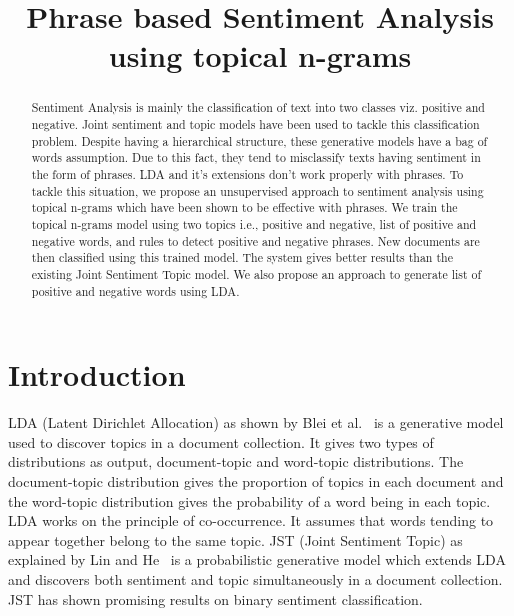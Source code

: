 \documentclass[11pt]{article}
\title{Phrase based Sentiment Analysis using topical n-grams}
\date{}
\begin{document}
\maketitle
\begin{abstract}
Sentiment Analysis is mainly the classification of text into two classes viz. 
positive and negative. Joint sentiment and topic models have been used to 
tackle this classification problem.  Despite having a hierarchical structure, 
these generative models have a bag of words assumption. Due to this fact, 
they tend to misclassify texts having sentiment in the form of phrases. LDA 
and it's extensions don't work properly with phrases. To tackle this situation, 
we propose an unsupervised approach to sentiment analysis using topical n-grams
which have been shown to be effective with phrases. We train the topical n-grams 
model using two topics i.e., positive and negative, list of positive and negative 
words, and rules to detect positive and negative phrases. New documents are then 
classified using this trained model. The system gives better results than the 
existing Joint Sentiment Topic model. We also propose an approach to generate 
list of positive and negative words using LDA.

\end{abstract}

\section{Introduction}


\indent LDA (Latent Dirichlet Allocation) as shown by Blei et al.~ 
is a generative model used to discover topics in a document collection. It gives two types of 
distributions as output, document-topic and word-topic distributions. The document-topic
distribution gives the proportion of topics in each document and the word-topic 
distribution gives the probability of a word being in each topic. LDA works on the 
principle of co-occurrence. It assumes that words tending to appear together belong 
to the same topic. JST (Joint Sentiment Topic) as explained by Lin and He~ 
is a probabilistic generative model which extends LDA and discovers both sentiment 
and topic simultaneously in a document collection. JST has shown promising results 
on binary sentiment classification. 
\end{document}
